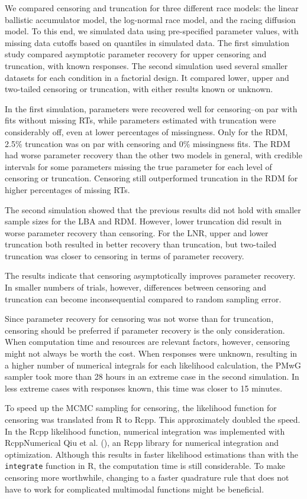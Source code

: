 \documentclass[
  man,
  floatsintext,
  longtable,
  nolmodern,
  notxfonts,
  notimes,
  colorlinks=true,linkcolor=blue,citecolor=blue,urlcolor=blue]{apa7}
\begin{document}
We compared censoring and truncation for three different race models:
the linear ballistic accumulator model, the log-normal race model, and
the racing diffusion model. To this end, we simulated data using
pre-specified parameter values, with missing data cutoffs based on
quantiles in simulated data. The first simulation study compared
asymptotic parameter recovery for upper censoring and truncation, with
known responses. The second simulation used several smaller datasets for
each condition in a factorial design. It compared lower, upper and
two-tailed censoring or truncation, with either results known or
unknown.

In the first simulation, parameters were recovered well for
censoring--on par with fits without missing RTs, while parameters
estimated with truncation were considerably off, even at lower
percentages of missingness. Only for the RDM, 2.5\% truncation was on
par with censoring and 0\% missingness fits. The RDM had worse parameter
recovery than the other two models in general, with credible intervals
for some parameters missing the true parameter for each level of
censoring or truncation. Censoring still outperformed truncation in the
RDM for higher percentages of missing RTs.

The second simulation showed that the previous results did not hold with
smaller sample sizes for the LBA and RDM. However, lower truncation did
result in worse parameter recovery than censoring. For the LNR, upper
and lower truncation both resulted in better recovery than truncation,
but two-tailed truncation was closer to censoring in terms of parameter
recovery.

The results indicate that censoring asymptotically improves parameter
recovery. In smaller numbers of trials, however, differences between
censoring and truncation can become inconsequential compared to random
sampling error.

Since parameter recovery for censoring was not worse than for
truncation, censoring should be preferred if parameter recovery is the
only consideration. When computation time and resources are relevant
factors, however, censoring might not always be worth the cost. When
responses were unknown, resulting in a higher number of numerical
integrals for each likelihood calculation, the PMwG sampler took more
than 28 hours in an extreme case in the second simulation. In less
extreme cases with responses known, this time was closer to 15 minutes.

To speed up the MCMC sampling for censoring, the likelihood function for
censoring was translated from R to Rcpp. This approximately doubled the
speed. In the Rcpp likelihood function, numerical integration was
implemented with RcppNumerical Qiu et al.
(), an Rcpp library for numerical
integration and optimization. Although this results in faster likelihood
estimations than with the \texttt{integrate} function in R, the
computation time is still considerable. To make censoring more
worthwhile, changing to a faster quadrature rule that does not have to
work for complicated multimodal functions might be beneficial.
\end{document}
